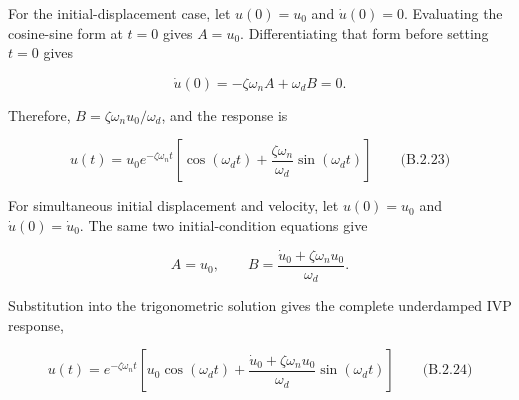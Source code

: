 \clearpage
{}



For the initial-displacement case, let $u(0)=u_0$ and $\dot{u}(0)=0$. Evaluating the cosine-sine form at $t=0$ gives $A=u_0$. Differentiating that form before setting $t=0$ gives

\[
\dot{u}(0)=-\zeta\omega_nA+\omega_dB=0.
\]

Therefore, $B=\zeta\omega_nu_0/\omega_d$, and the response is

\[
\boxed{u(t)=u_0e^{-\zeta\omega_nt}\left[\cos(\omega_dt)+\frac{\zeta\omega_n}{\omega_d}\sin(\omega_dt)\right]}
\qquad\text{(B.2.23)}
\]

For simultaneous initial displacement and velocity, let $u(0)=u_0$ and $\dot{u}(0)=\dot{u}_0$. The same two initial-condition equations give

\[
A=u_0,
\qquad
B=\frac{\dot{u}_0+\zeta\omega_nu_0}{\omega_d}.
\]

Substitution into the trigonometric solution gives the complete underdamped IVP response,

\[
\boxed{u(t)=e^{-\zeta\omega_nt}\left[u_0\cos(\omega_dt)+\frac{\dot{u}_0+\zeta\omega_nu_0}{\omega_d}\sin(\omega_dt)\right]}
\qquad\text{(B.2.24)}
\]

\endgroup
